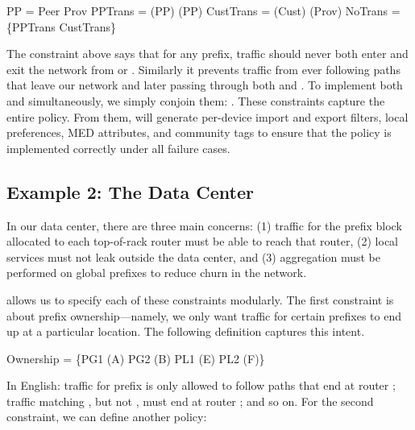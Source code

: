 \begin{code}
\Define PP = Peer \OR Prov
\Define PPTrans   = \Enter(PP) \AND \Exit(PP)
\Define CustTrans = \Later(Cust) \AND \Later(Prov)
\Define NoTrans   = \{\True \Path \NOT{}PPTrans \AND \NOT{}CustTrans\}
\end{code}
\noindent
The  constraint above says that for any prefix, traffic should never both enter and exit the network from  or . Similarly it prevents traffic from ever following paths that leave our network and later passing through both  and .  To implement both 
and  simultaneously, we simply conjoin them: .
%
%
These constraints capture the entire policy. From them, \sysname will generate per-device import and export filters, local preferences,
MED attributes, and community tags to ensure that the policy is
implemented correctly under all failure cases.

\subsection{Example 2: The Data Center}

In our data center,
there are three main concerns:
(1) traffic for the prefix block allocated to each top-of-rack router must be able to reach that router,
(2) local services must not leak outside the data center, and
(3) aggregation must be performed on global prefixes to reduce churn
in the network.

\sysname allows us to specify each of these constraints modularly. The first constraint is about prefix ownership---namely, we only want traffic for certain prefixes to end up at a particular location. The following definition captures this intent.


\begin{code}
\Define Ownership = 
    \{PG1 \Path \End(A)
     PG2 \Path \End(B)
     PL1 \Path \End(E)
     PL2 \Path \End(F)\}
\end{code}
\noindent
In English: traffic for prefix  is only allowed to follow paths that
end at router ; traffic matching ,
but not , must
end at router ; and so on.
For the second constraint, we can define another policy:

